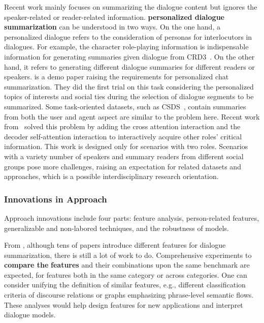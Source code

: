 Recent work mainly focuses on summarizing the dialogue content but ignores the speaker-related or reader-related information. 
\textbf{personalized dialogue summarization} can be understood in two ways. 
On the one hand, a personalized dialogue refers to the consideration of 
personas for interlocutors in dialogues. For example, the character 
role-playing information is indispensable information for generating 
summaries given dialogue from CRD3~\cite{rameshkumar2020storytelling}.
On the other hand, it refers to generating different dialogue summaries for 
different readers or speakers. \citet{tepper2018personal} is a demo paper raising the 
requirements for personalized chat summarization. They did the first trial 
on this task considering the personalized topics of interests and social ties 
during the selection of dialogue segments to be summarized. 
Some task-oriented datasets, such as CSDS~\cite{lin2021csds}, contain summaries from both the user and agent aspect are similar
to the problem here. Recent work from~\citet{lin2022other} solved this problem by adding the cross attention interaction and the decoder self-attention interaction to interactively acquire other roles' critical information. This work is designed only for scenarios with two roles.
Scenarios with a variety number of speakers and summary readers from different social groups pose more challenges, raising an
expectation for related datasets and approaches, which is a possible interdisciplinary research orientation.


\subsubsection{Innovations in Approach} 
Approach innovations include four parts:  feature analysis, person-related features, generalizable and non-labored techniques, and the robustness of models.

From , although tens of papers 
introduce different features for dialogue summarization, there is still 
a lot of work to do. Comprehensive experiments to \textbf{compare the} \textbf{features} and 
their combinations upon the same benchmark are expected, 
for features both in the same category or across categories. 
One can consider unifying the definition of similar features, 
e.g., different classification criteria of discourse relations or graphs emphasizing phrase-level semantic flows. 
These analyses would help design features for new applications and interpret dialogue models.


